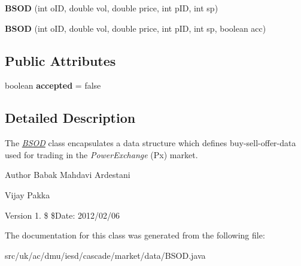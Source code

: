 \begin{DoxyCompactItemize}
\item 
\hypertarget{classuk_1_1ac_1_1dmu_1_1iesd_1_1cascade_1_1market_1_1data_1_1_b_s_o_d_a5ff8e879cb462458f3195df432837db5}{{\bfseries B\-S\-O\-D} (int o\-I\-D, double vol, double price, int p\-I\-D, int sp)}\label{classuk_1_1ac_1_1dmu_1_1iesd_1_1cascade_1_1market_1_1data_1_1_b_s_o_d_a5ff8e879cb462458f3195df432837db5}

\item 
\hypertarget{classuk_1_1ac_1_1dmu_1_1iesd_1_1cascade_1_1market_1_1data_1_1_b_s_o_d_a422f7556e3391cfd48589339b59e43bf}{{\bfseries B\-S\-O\-D} (int o\-I\-D, double vol, double price, int p\-I\-D, int sp, boolean acc)}\label{classuk_1_1ac_1_1dmu_1_1iesd_1_1cascade_1_1market_1_1data_1_1_b_s_o_d_a422f7556e3391cfd48589339b59e43bf}

\end{DoxyCompactItemize}
\subsection*{Public Attributes}
\begin{DoxyCompactItemize}
\item 
\hypertarget{classuk_1_1ac_1_1dmu_1_1iesd_1_1cascade_1_1market_1_1data_1_1_b_s_o_d_a524d8a172a9fba9d1b3fbe12f64b9268}{boolean {\bfseries accepted} = false}\label{classuk_1_1ac_1_1dmu_1_1iesd_1_1cascade_1_1market_1_1data_1_1_b_s_o_d_a524d8a172a9fba9d1b3fbe12f64b9268}

\end{DoxyCompactItemize}


\subsection{Detailed Description}
The {\itshape \hyperlink{classuk_1_1ac_1_1dmu_1_1iesd_1_1cascade_1_1market_1_1data_1_1_b_s_o_d}{B\-S\-O\-D}} class encapsulates a data structure which defines buy-\/sell-\/offer-\/data used for trading in the {\itshape Power\-Exchange} (Px) market. 

\begin{DoxyAuthor}{Author}
Babak Mahdavi Ardestani 

Vijay Pakka 
\end{DoxyAuthor}
\begin{DoxyVersion}{Version}
1. \$ \$\-Date\-: 2012/02/06 
\end{DoxyVersion}


The documentation for this class was generated from the following file\-:\begin{DoxyCompactItemize}
\item 
src/uk/ac/dmu/iesd/cascade/market/data/B\-S\-O\-D.\-java\end{DoxyCompactItemize}
